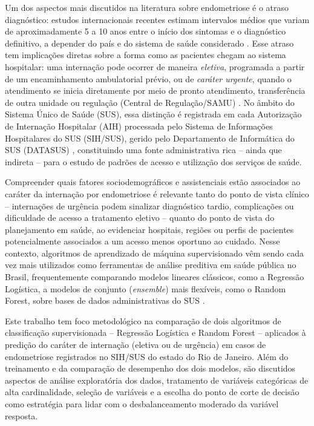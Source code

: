 \documentclass[12pt,a4paper]{article}
\begin{document}
Um dos aspectos mais discutidos na literatura sobre endometriose é o atraso diagnóstico: estudos internacionais recentes estimam intervalos médios que variam de aproximadamente 5 a 10 anos entre o início dos sintomas e o diagnóstico definitivo, a depender do país e do sistema de saúde considerado \cite{ellis2024}. Esse atraso tem implicações diretas sobre a forma como as pacientes chegam ao sistema hospitalar: uma internação pode ocorrer de maneira \emph{eletiva}, programada a partir de um encaminhamento ambulatorial prévio, ou de \emph{caráter urgente}, quando o atendimento se inicia diretamente por meio de pronto atendimento, transferência de outra unidade ou regulação (Central de Regulação/SAMU) \cite{sihsus_rj}. No âmbito do Sistema Único de Saúde (SUS), essa distinção é registrada em cada Autorização de Internação Hospitalar (AIH) processada pelo Sistema de Informações Hospitalares do SUS (SIH/SUS), gerido pelo Departamento de Informática do SUS (DATASUS) \cite{datasus_sih}, constituindo uma fonte administrativa rica -- ainda que indireta -- para o estudo de padrões de acesso e utilização dos serviços de saúde.

Compreender quais fatores sociodemográficos e assistenciais estão associados ao caráter da internação por endometriose é relevante tanto do ponto de vista clínico -- internações de urgência podem sinalizar diagnóstico tardio, complicações ou dificuldade de acesso a tratamento eletivo -- quanto do ponto de vista do planejamento em saúde, ao evidenciar hospitais, regiões ou perfis de pacientes potencialmente associados a um acesso menos oportuno ao cuidado. Nesse contexto, algoritmos de aprendizado de máquina supervisionado vêm sendo cada vez mais utilizados como ferramentas de análise preditiva em saúde pública no Brasil, frequentemente comparando modelos lineares clássicos, como a Regressão Logística, a modelos de conjunto (\textit{ensemble}) mais flexíveis, como o Random Forest, sobre bases de dados administrativas do SUS \cite{santos2019}.

Este trabalho tem foco metodológico na comparação de dois algoritmos de classificação supervisionada -- Regressão Logística \cite{hosmer2013} e Random Forest \cite{breiman2001} -- aplicados à predição do caráter de internação (eletiva ou de urgência) em casos de endometriose registrados no SIH/SUS do estado do Rio de Janeiro. Além do treinamento e da comparação de desempenho dos dois modelos, são discutidos aspectos de análise exploratória dos dados, tratamento de variáveis categóricas de alta cardinalidade, seleção de variáveis e a escolha do ponto de corte de decisão como estratégia para lidar com o desbalanceamento moderado da variável resposta.
\end{document}
